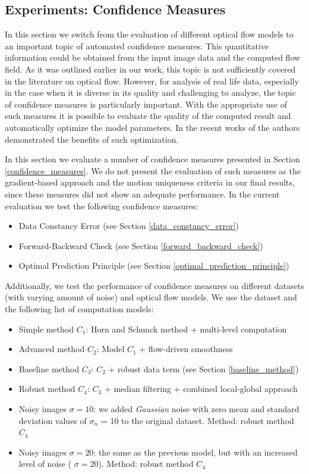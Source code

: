 \subsection{Experiments: Confidence Measures}
\label{exp_confidence_evaluation}

In this section we switch from the evaluation of different optical flow models to an important topic of automated confidence measures. This quantitative information could be obtained from the input image data and the computed flow field. As it was outlined earlier in our work, this topic is not sufficiently covered in the literature on optical flow. However, for analysis of real life data, especially in the case when it is diverse in its quality  and challenging to analyze, the topic of confidence measures is particularly important. With the appropriate use of such measures it is possible to evaluate the quality of the computed result and automatically optimize the model parameters. In the recent works of \cite{Sun10, HarmonyFlow} the authors demonstrated the benefits of such optimization.  

In this section we evaluate a number of confidence measures presented in Section \ref{confidence_measures}. We do not present the evaluation of such measures as the gradient-based approach and the motion uniqueness criteria in our final results, since these measures did not show an adequate performance. In the current evaluation we test the following confidence measures:
\begin{itemize}
	\item Data Constancy Error (see Section \ref{data_constancy_error})
    \item Forward-Backward Check (see Section \ref{forward_backward_check})
    \item Optimal Prediction Principle (see Section \ref{optimal_prediction_principle})
\end{itemize}

Additionally, we test the performance of confidence measures on different datasets (with varying amount of noise) and optical flow models. We use the \rub dataset and the following list of computation models:
\begin{itemize}
	\item Simple method $C_1$: Horn and Schunck method + multi-level computation 
	\item Advanced method $C_2$: Model $C_1$ + flow-driven smoothness  
	\item Baseline method $C_3$: $C_2$ + robust data term (see Section \ref{baseline_method}) 
	\item Robust method $C_4$: $C_3$ +  median filtering + combined local-global approach
    \item Noisy images $\sigma = 10$: we added \textit{Gaussian} noise 
     with zero mean and standard deviation values of $\sigma_n$ = 10 to the original \rub dataset. Method: robust method $C_4$ 
    \item Noisy images $\sigma = 20$: the same as the previous model, but with an increased level of noise ( $\sigma = 20$). Method: robust method $C_4$
    
\end{itemize}


